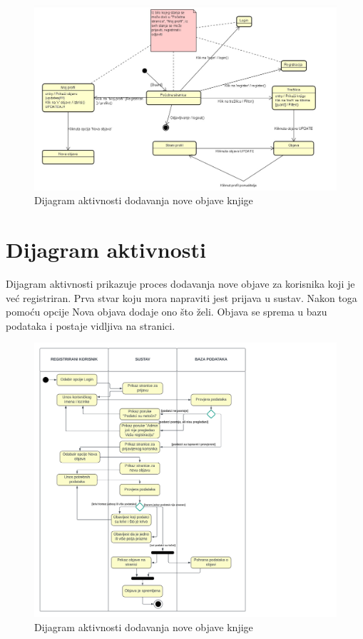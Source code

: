            		\begin{figure}[h]
				\centering
				\includegraphics[width = \textwidth]{slike/dijagram_stanja.jpg}
				\caption{Dijagram aktivnosti dodavanja nove objave knjige}
				\label{fig:enter-label}
			\end{figure}
			
			\eject 
			
		
		\section{Dijagram aktivnosti}
		
			\raggedright{Dijagram aktivnosti prikazuje proces dodavanja nove objave za korisnika koji je već registriran. Prva stvar koju mora napraviti jest prijava u sustav. Nakon toga pomoću opcije Nova objava dodaje ono što želi. Objava se sprema u bazu podataka i postaje vidljiva na stranici.}\\
			
			\begin{figure}[h]
				\centering
				\includegraphics[width = \textwidth]{slike/dijagram_akt.PNG}
				\caption{Dijagram aktivnosti dodavanja nove objave knjige}
				\label{fig:enter-label}
			\end{figure}
			\eject
			
